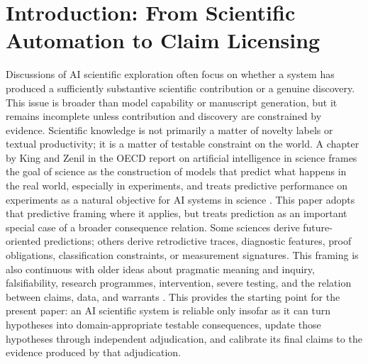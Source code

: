 \documentclass[11pt,a4paper]{article}
\begin{document}
\section{Introduction: From Scientific Automation to Claim Licensing}

Discussions of AI scientific exploration often focus on whether a system has produced a sufficiently substantive scientific contribution or a genuine discovery. This issue is broader than model capability or manuscript generation, but it remains incomplete unless contribution and discovery are constrained by evidence. Scientific knowledge is not primarily a matter of novelty labels or textual productivity; it is a matter of testable constraint on the world. A chapter by King and Zenil in the OECD report on artificial intelligence in science frames the goal of science as the construction of models that predict what happens in the real world, especially in experiments, and treats predictive performance on experiments as a natural objective for AI systems in science \citep{OECD2023Framework,KingZenil2023AIDrivenScience}. This paper adopts that predictive framing where it applies, but treats prediction as an important special case of a broader consequence relation. Some sciences derive future-oriented predictions; others derive retrodictive traces, diagnostic features, proof obligations, classification constraints, or measurement signatures. This framing is also continuous with older ideas about pragmatic meaning and inquiry, falsifiability, research programmes, intervention, severe testing, and the relation between claims, data, and warrants \citep{Peirce1878Ideas,Popper1959Logic,Lakatos1970Falsification,Hacking1983Representing,Mayo1996Error,Toulmin1958Uses}. This provides the starting point for the present paper: an AI scientific system is reliable only insofar as it can turn hypotheses into domain-appropriate testable consequences, update those hypotheses through independent adjudication, and calibrate its final claims to the evidence produced by that adjudication.
\end{document}
